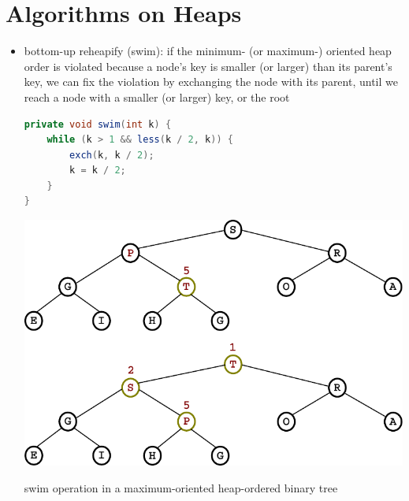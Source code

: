 \documentclass[8pt,a4paper,compress]{beamer}
\begin{document}
\section{Algorithms on Heaps}
\begin{frame}[fragile]
\begin{itemize}
\item bottom-up reheapify (swim): if the minimum- (or maximum-) oriented heap order is violated because a node's key is smaller (or larger) than its parent's key, we can fix the violation by exchanging the node with its parent, until we reach a node with a smaller (or larger) key, or the root

\bigskip

\begin{minipage}{150pt}
\begin{lstlisting}[language=Java]
private void swim(int k) {
    while (k > 1 && less(k / 2, k)) { 
        exch(k, k / 2); 
        k = k / 2; 
    }
}
\end{lstlisting}
\end{minipage}%
\begin{minipage}{130pt}
\hfill \includegraphics[scale=0.35]{./figures/heapify_swim.pdf}
\end{minipage}

\smallskip

\begin{center}
swim operation in a maximum-oriented heap-ordered binary tree
\end{center}
\end{itemize}
\end{frame}
\end{document}

